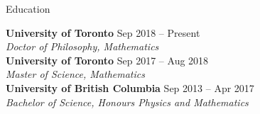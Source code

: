 \documentclass{resume}
\begin{document}
\begin{rSection}{Education}

\textbf{University of Toronto} \hfill {\normalfont Sep 2018 -- Present} \\
{\normalfont \textit{Doctor of Philosophy, Mathematics}} \\
\textbf{University of Toronto} \hfill {\normalfont Sep 2017 -- Aug 2018} \\
{\normalfont \textit{Master of Science, Mathematics}} \\
\textbf{University of British Columbia} \hfill {\normalfont Sep 2013 -- Apr 2017}\\
{\normalfont \textit{Bachelor of Science, Honours Physics and Mathematics}}

\end{rSection}

\end{document}
